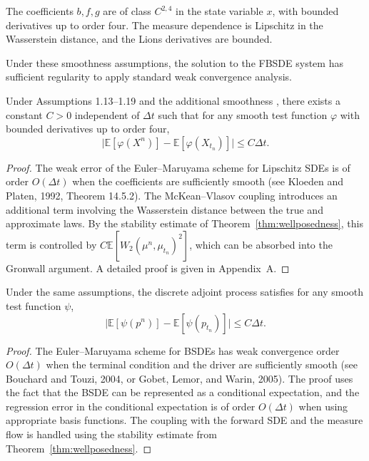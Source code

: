 \begin{assumption}[Smoothness]
\label{ass:na-smoothness}
The coefficients $b, f, g$ are of class $C^{2,4}$ in the state variable $x$, with
bounded derivatives up to order four. The measure dependence is Lipschitz in the
Wasserstein distance, and the Lions derivatives are bounded.
\end{assumption}

Under these smoothness assumptions, the solution to the FBSDE system has sufficient
regularity to apply standard weak convergence analysis.

\begin{lemma}
\label{lem:weak-error-forward}
Under Assumptions 1.13--1.19 and the additional smoothness
, there exists a constant $C > 0$ independent of $\Delta t$
such that for any smooth test function $\varphi$ with bounded derivatives up to order
four,
\[
    \big| \mathbb{E}[\varphi(X^n)] - \mathbb{E}[\varphi(X_{t_n})] \big| \leq C \Delta t.
\]
\end{lemma}

\begin{proof}
The weak error of the Euler--Maruyama scheme for Lipschitz SDEs is of order
$O(\Delta t)$ when the coefficients are sufficiently smooth (see Kloeden and Platen,
1992, Theorem 14.5.2). The McKean--Vlasov coupling introduces an additional term
involving the Wasserstein distance between the true and approximate laws. By the
stability estimate of Theorem~\ref{thm:wellposedness}, this term is controlled by
$C \mathbb{E}[W_2(\mu^n, \mu_{t_n})^2]$, which can be absorbed into the Gronwall
argument. A detailed proof is given in Appendix~A.
\end{proof}

\begin{lemma}
\label{lem:weak-error-adjoint}
Under the same assumptions, the discrete adjoint process satisfies for any smooth test
function $\psi$,
\[
    \big| \mathbb{E}[\psi(p^n)] - \mathbb{E}[\psi(p_{t_n})] \big| \leq C \Delta t.
\]
\end{lemma}

\begin{proof}
The Euler--Maruyama scheme for BSDEs has weak convergence order $O(\Delta t)$ when the
terminal condition and the driver are sufficiently smooth (see Bouchard and Touzi,
2004, or Gobet, Lemor, and Warin, 2005). The proof uses the fact that the BSDE can be
represented as a conditional expectation, and the regression error in the conditional
expectation is of order $O(\Delta t)$ when using appropriate basis functions. The
coupling with the forward SDE and the measure flow is handled using the stability
estimate from Theorem~\ref{thm:wellposedness}.
\end{proof}

